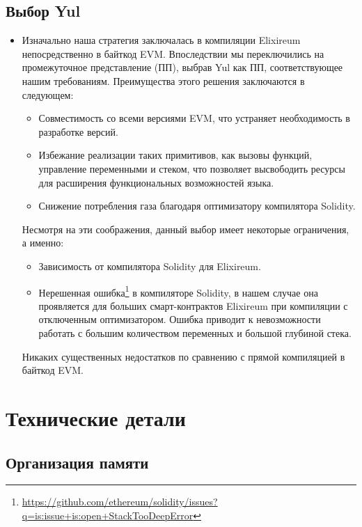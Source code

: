 \subsection{Выбор Yul}
\begin{itemize}
    \item Изначально наша стратегия заключалась в компиляции Elixireum непосредственно в байткод EVM. Впоследствии мы переключились на промежуточное представление (ПП), выбрав Yul как ПП, соответствующее нашим требованиям. Преимущества этого решения заключаются в следующем:
        \begin{itemize}
            \item Совместимость со всеми версиями EVM, что устраняет необходимость в разработке версий. 
            \item Избежание реализации таких примитивов, как вызовы функций, управление переменными и стеком, что позволяет высвободить ресурсы для расширения функциональных возможностей языка.
            \item Снижение потребления газа благодаря оптимизатору компилятора Solidity.
        \end{itemize}
      Несмотря на эти соображения, данный выбор имеет некоторые ограничения, а именно:
        \begin{itemize}
            \item Зависимость от компилятора Solidity для Elixireum.
            \item Нерешенная ошибка\footnote{\href{https://github.com/ethereum/solidity/issues?q=is:issue+is:open+StackTooDeepError}{https://github.com/ethereum/solidity/issues?q=is:issue+is:open+StackTooDeepError}} в компиляторе Solidity, в нашем случае она проявляется для больших смарт-контрактов Elixireum при компиляции с отключенным оптимизатором. Ошибка приводит к невозможности работать с большим количеством переменных и большой глубиной стека.
        \end{itemize}
      Никаких существенных недостатков по сравнению с прямой компиляцией в байткод EVM.
\end{itemize}

\section{Технические детали}
\label{sec:tech_details}

\subsection{Организация памяти}
\label{sec:memory_organization}

